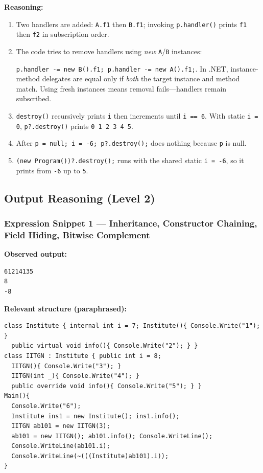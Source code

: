 \textbf{Reasoning:}
\begin{enumerate}
  \item Two handlers are added: \verb|A.f1| then \verb|B.f1|; invoking \verb|p.handler()| prints \verb|f1| then \verb|f2| in subscription order.
  \item The code tries to remove handlers using \emph{new} \verb|A|/\verb|B| instances: 
  
  \verb|p.handler -= new B().f1; p.handler -= new A().f1;|.  
        In .NET, instance-method delegates are equal only if \emph{both} the target instance and method match.  
        Using fresh instances means removal fails—handlers remain subscribed.
  \item \verb|destroy()| recursively prints \verb|i| then increments until \verb|i == 6|.  
        With static \verb|i = 0|, \verb|p?.destroy()| prints \verb|0 1 2 3 4 5|.
  \item After \verb|p = null; i = -6; p?.destroy();| does nothing because \verb|p| is null.
  \item \verb|(new Program())?.destroy();| runs with the shared static \verb|i = -6|, so it prints from \verb|-6| up to \verb|5|.
\end{enumerate}

\subsection{Output Reasoning (Level 2)}

\subsubsection*{Expression Snippet 1 — Inheritance, Constructor Chaining, Field Hiding, Bitwise Complement}
\textbf{Observed output:}
\begin{verbatim}
61214135
8
-8
\end{verbatim}

\textbf{Relevant structure (paraphrased):}
\begin{verbatim}
class Institute { internal int i = 7; Institute(){ Console.Write("1"); } 
  public virtual void info(){ Console.Write("2"); } }
class IITGN : Institute { public int i = 8; 
  IITGN(){ Console.Write("3"); } 
  IITGN(int _){ Console.Write("4"); } 
  public override void info(){ Console.Write("5"); } }
Main(){
  Console.Write("6");
  Institute ins1 = new Institute(); ins1.info();
  IITGN ab101 = new IITGN(3);
  ab101 = new IITGN(); ab101.info(); Console.WriteLine();
  Console.WriteLine(ab101.i);
  Console.WriteLine(~(((Institute)ab101).i));
}
\end{verbatim}

